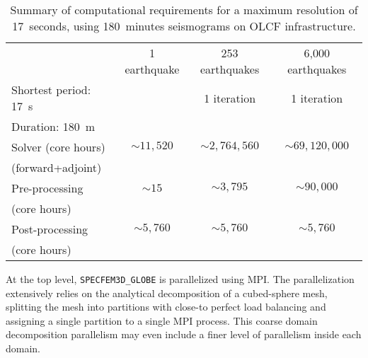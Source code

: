 \begin{table}
\begin{center}
  \caption[Summary of computation requirements for 180~min seismograms at 17~seconds]
  {\small{Summary of computational requirements for a maximum resolution of 17~seconds,
    using 180~minutes seismograms on OLCF infrastructure.}}
\begin{tabular}{lccc}
       &   1 earthquake & 253 earthquakes  & 6,000 earthquakes  \\
Shortest period: 17~s     &                      & 1 iteration      & 1 iteration      \\
Duration: 180~m &                      &                        &                   \\
\midrule%
Solver (core hours) &  $\sim 11,520$   & $\sim 2,764,560$ & $\sim 69,120,000$ \\
(forward+adjoint)   & & & \\
Pre-processing    & $\sim 15$  & $\sim 3,795$     & $\sim 90,000$ \\
(core hours)      & & & \\
Post-processing  & $\sim 5,760$  & $\sim 5,760$     & $\sim 5,760$ \\
(core hours)     & & & \\
\end{tabular}
\label{tab:comp_storage_req_17s}
\end{center}
\end{table}

At the top level, \texttt{SPECFEM3D\_GLOBE} is parallelized using MPI. The
parallelization extensively relies on the analytical decomposition of a
cubed-sphere mesh, splitting the mesh into partitions with close-to perfect load
balancing and assigning a single partition to a single MPI process. This coarse
domain decomposition parallelism may even include a finer level of parallelism
inside each domain.

